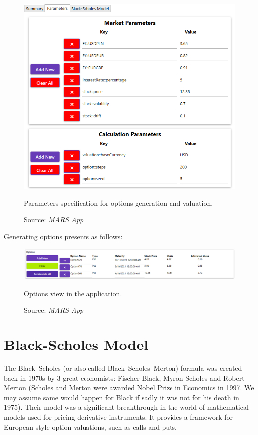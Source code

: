     \begin{figure}[H]
            \centering
            \includegraphics[width=\textwidth]{img/specifyParameters.png}
            \caption{Parameters specification for options generation and valuation.}
            \caption*{Source: \textit{MARS App}}
            \label{fig:parametersPresentation}
    \end{figure}
    Generating options presents as follows:
    \begin{figure}[H]
            \centering
            \includegraphics[width=\textwidth]{img/optionsPresentation.png}
            \caption{Options view in the application.}
            \caption*{Source: \textit{MARS App}}
            \label{fig:optionsPresentation}
    \end{figure}
\section{Black-Scholes Model}
    The Black--Scholes (or also called Black--Scholes--Merton) formula was created back in 1970s by 3 great economists: Fischer Black, Myron Scholes and Robert Merton (Scholes and Merton were awarded Nobel Prize in Economics in 1997. We may assume same would happen for Black if sadly it was not for his death in 1975).
    Their model was a significant breakthrough in the world of mathematical models used for pricing derivative instruments. It provides a framework for European-style option valuations, such as calls and puts.
    

